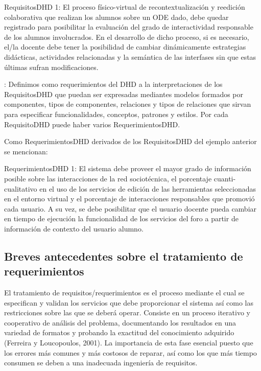 \begin{ejemplo}
RequisitosDHD 1: El proceso físico-virtual de recontextualización y reedición colaborativa que realizan los alumnos sobre un ODE dado, debe quedar registrado para posibilitar la evaluación del grado de interactividad responsable de los alumnos involucrados. 
En el desarrollo de dicho proceso, si es necesario, el/la docente debe tener la posibilidad de cambiar dinámicamente estrategias didácticas, actividades relacionadas y la semántica de las interfases sin que estas últimas sufran modificaciones.
\end{ejemplo}

\begin{defi} : Definimos como requerimientos del
DHD a la interpretaciones de los RequisitosDHD que puedan ser expresadas
mediantes modelos formados por componentes, tipos de componentes, relaciones
y tipos de relaciones que sirvan para especificar funcionalidades, conceptos,
patrones y estilos. Por cada RequisitoDHD puede haber varios RequerimientosDHD.
\end{defi}\label{requerimiento}
 
Como RequerimientosDHD derivados de los RequisitosDHD del ejemplo anterior se mencionan:

\begin{ejemplo}
RequerimientosDHD 1: El sistema debe proveer el mayor grado de información posible sobre las interacciones de la red sociotécnica, el porcentaje cuanti-cualitativo en el uso de los servicios de edición de las herramientas seleccionadas en el entorno virtual y el porcentaje de interacciones responsables que promovió cada usuario.
A su vez, se debe posibilitar que el usuario docente pueda cambiar en tiempo
de ejecución la funcionalidad de los servicios del foro a partir de información
de contexto del usuario alumno.
\end{ejemplo}


\subsection{Breves antecedentes sobre el tratamiento de requerimientos}

El tratamiento de requisitos/requerimientos es el proceso mediante el cual se especifican
y validan los servicios que debe proporcionar el sistema así como las
restricciones sobre las que se deberá operar. Consiste en un proceso iterativo
y cooperativo de análisis del problema, documentando los resultados en
una variedad de formatos y probando la exactitud del conocimiento
adquirido (Ferreira y Loucopoulos, 2001). La importancia de esta fase
esencial puesto que los errores más comunes y más costosos de reparar, así
como los que más tiempo consumen se deben a una inadecuada ingeniería de
requisitos.


